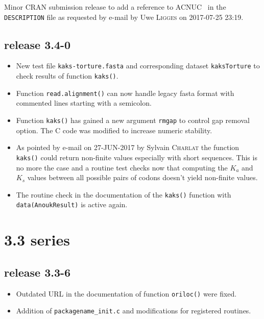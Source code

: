\documentclass{article}
\begin{document}
Minor CRAN submission release to add a reference to ACNUC~\cite{acnuc1984} in the \texttt{DESCRIPTION} file as requested by e-mail by Uwe \textsc{Ligges} on 2017-07-25 23:19.

\subsection*{release 3.4-0}

\begin{itemize}

\item New test file \texttt{kaks-torture.fasta} and corresponding dataset \texttt{kaksTorture} to check results of function \texttt{kaks()}.

\item Function \texttt{read.alignment()} can now handle legacy fasta format with commented lines starting with a semicolon.

\item Function \texttt{kaks()} has gained a new argument \texttt{rmgap} to control gap removal option. The C code was modified to increase numeric stability.

\item As pointed by e-mail on 27-JUN-2017 by Sylvain \textsc{Charlat} the function \texttt{kaks()} could return non-finite values especially with short sequences. This is no more the case and a routine test checks now that computing the $K_a$ and $K_s$ values between all possible pairs of codons doesn't yield non-finite values.

\item The routine check in the documentation of the \texttt{kaks()} function with \texttt{data(AnoukResult)} is active again.

\end{itemize}

\section*{3.3 series}

\subsection*{release 3.3-6}

\begin{itemize}

\item Outdated URL in the documentation of function \texttt{oriloc()} were fixed.

\item Addition of \texttt{packagename\_init.c} and modifications for registered routines.

\end{itemize}
\end{document}
